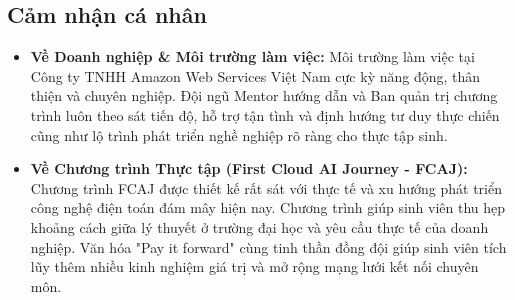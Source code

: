 \documentclass[a4paper]{article}
\theoremstyle{definition}
\begin{document}
\subsection{Cảm nhận cá nhân}

\begin{itemize}
    \item \textbf{Về Doanh nghiệp \& Môi trường làm việc:}
    Môi trường làm việc tại Công ty TNHH Amazon Web Services Việt Nam cực kỳ năng động, thân thiện và chuyên nghiệp. Đội ngũ Mentor hướng dẫn và Ban quản trị chương trình luôn theo sát tiến độ, hỗ trợ tận tình và định hướng tư duy thực chiến cũng như lộ trình phát triển nghề nghiệp rõ ràng cho thực tập sinh.

    \item \textbf{Về Chương trình Thực tập (First Cloud AI Journey - FCAJ):}
    Chương trình FCAJ được thiết kế rất sát với thực tế và xu hướng phát triển công nghệ điện toán đám mây hiện nay. Chương trình giúp sinh viên thu hẹp khoảng cách giữa lý thuyết ở trường đại học và yêu cầu thực tế của doanh nghiệp. Văn hóa "Pay it forward" cùng tinh thần đồng đội giúp sinh viên tích lũy thêm nhiều kinh nghiệm giá trị và mở rộng mạng lưới kết nối chuyên môn.
\end{itemize}


\end{document}
